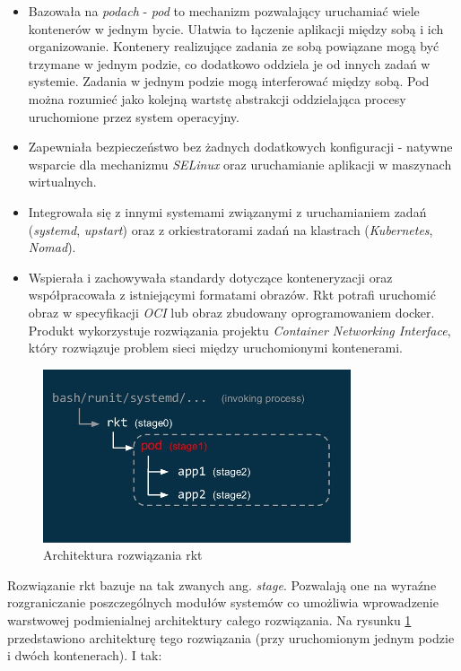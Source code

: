 \documentclass[10pt,a4paper,titlepage,twoside]{report}
\begin{document}
\begin{itemize}
\item Bazowała na \textit{podach} - \textit{pod} to mechanizm pozwalający uruchamiać wiele kontenerów w jednym bycie. Ułatwia to łączenie aplikacji między sobą i ich organizowanie. Kontenery realizujące zadania ze sobą powiązane mogą być trzymane w jednym podzie, co dodatkowo oddziela je od innych zadań w systemie. Zadania w jednym podzie mogą interferować między sobą. Pod można rozumieć jako kolejną wartstę abstrakcji oddzielająca procesy uruchomione przez system operacyjny.
\item Zapewniała bezpieczeństwo bez żadnych dodatkowych konfiguracji - natywne wsparcie dla mechanizmu \textit{SELinux} oraz uruchamianie aplikacji w maszynach wirtualnych.
\item Integrowała się z innymi systemami związanymi z uruchamianiem zadań (\textit{systemd}, \textit{upstart}) oraz z orkiestratorami zadań na klastrach (\textit{Kubernetes}, \textit{Nomad}).
\item Wspierała i zachowywała standardy dotyczące konteneryzacji oraz współpracowała z istniejącymi formatami obrazów. Rkt potrafi uruchomić obraz w specyfikacji \textit{OCI} lub obraz zbudowany oprogramowaniem docker. Produkt wykorzystuje rozwiązania projektu \textit{Container Networking Interface}, który rozwiązuje problem sieci między uruchomionymi kontenerami.
\end{itemize}

\begin{figure}[!h]
	\centering
	\includegraphics[scale=1]{pics/rkt-architecure.jpg}
	\caption{Architektura rozwiązania rkt}
	\label{rkt_arch}
\end{figure}

Rozwiązanie rkt bazuje na tak zwanych ang. \textit{stage}. Pozwalają one na wyraźne rozgraniczanie poszczególnych modułów systemów co umożliwia wprowadzenie warstwowej podmienialnej architektury całego rozwiązania. Na rysunku \ref{rkt_arch} przedstawiono architekturę tego rozwiązania (przy uruchomionym jednym podzie i dwóch kontenerach). I tak:
\end{document}
